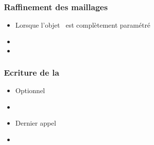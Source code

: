     \subsubsection{Raffinement des maillages }
      \begin{itemize}
	\item[\ding{0}] Lorsque l'objet \IGEN\ est complètement paramétré
	\item[\ding{0}] 
	\item[\ding{0}] 
      \end{itemize}
    \subsubsection{Ecriture de la \bdd\ }
      \begin{itemize}
	\item[\ding{0}] Optionnel
	\item[\ding{0}] 
	\item[\ding{0}] Dernier appel 
	\item[\ding{0}] 
      \end{itemize}
      
    \clearpage
      
